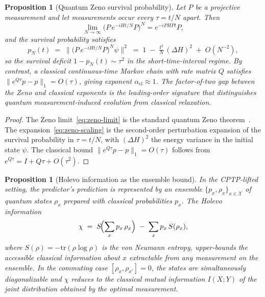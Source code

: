 \documentclass[11pt,a4paper]{article}
\theoremstyle{plain}
\newtheorem{proposition}[theorem]{Proposition}
\theoremstyle{definition}
\theoremstyle{remark}
\begin{document}
\begin{proposition}[Quantum Zeno survival probability]
\label{prop:zeno-survival}
Let $P$ be a projective measurement and let measurements occur every
$\tau = t/N$ apart. Then
\begin{equation}\label{eq:zeno-limit}
  \lim_{N\to\infty} \bigl(P\,e^{-iHt/N}P\bigr)^N = e^{-iPHPt}P,
\end{equation}
and the survival probability satisfies
\begin{equation}\label{eq:zeno-scaling}
  p_N(t) \;=\; \bigl\lVert \bigl(P\,e^{-iHt/N}P\bigr)^N \psi \bigr\rVert^2
  \;=\; 1 \;-\; \tfrac{t^2}{N}\,(\Delta H)^2 \;+\; O(N^{-2}),
\end{equation}
so the survival \emph{deficit} $1 - p_N(t) \sim \tau^2$ in the
short-time-interval regime. By contrast, a classical continuous-time
Markov chain with rate matrix $Q$ satisfies $\|e^{Q\tau} p - p\|_1 =
O(\tau)$, giving exponent $\alpha_{\mathrm{cl}} \approx 1$. The
factor-of-two gap between the Zeno and classical exponents is the
leading-order signature that distinguishes quantum
measurement-induced evolution from classical relaxation.
\end{proposition}

\begin{proof}
The Zeno limit~\eqref{eq:zeno-limit} is the standard quantum Zeno
theorem~\cite{misra1977,facchi2008}. The expansion~\eqref{eq:zeno-scaling}
is the second-order perturbation expansion of the survival probability
in $\tau = t/N$, with $(\Delta H)^2$ the energy variance in the
initial state $\psi$. The classical bound $\|e^{Q\tau} p - p\|_1 =
O(\tau)$ follows from $e^{Q\tau} = I + Q\tau + O(\tau^2)$.
\end{proof}

\begin{proposition}[Holevo information as the ensemble bound]
\label{prop:holevo}
In the CPTP-lifted setting, the predictor's prediction is represented
by an \emph{ensemble} $\{p_x, \rho_x\}_{x \in \mathcal X}$ of quantum
states $\rho_x$ prepared with classical probabilities $p_x$. The
Holevo information~\cite{holevo1973}
\begin{equation}\label{eq:holevo}
  \chi \;=\; S\!\Bigl(\sum_x p_x\,\rho_x\Bigr) \;-\; \sum_x p_x\,S(\rho_x),
\end{equation}
where $S(\rho) = -\mathrm{tr}(\rho \log \rho)$ is the von Neumann
entropy, upper-bounds the accessible classical information about $x$
extractable from any measurement on the ensemble. In the commuting
case $[\rho_x, \rho_{x'}] = 0$, the states are simultaneously
diagonalizable and $\chi$ reduces to the classical mutual information
$I(X; Y)$ of the joint distribution obtained by the optimal measurement.
\end{proposition}
\end{document}
